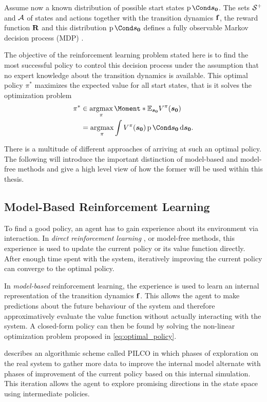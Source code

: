 Assume now a known distribution of possible start states $\Prob{\rv{s_0}}$.
The sets $\mathcal{S}^+$ and $\mathcal{A}$ of states and actions together with the transition dynamics $\operatorname{\mathbf{f}}$, the reward function $\operatorname{\mathbf{R}}$ and this distribution $\Prob{\rv{s_0}}$ defines a fully observable Markov decision process (MDP) \cite{sutton_reinforcement_1998,murphy_machine_2012}.

The objective of the reinforcement learning problem stated here is to find the most successful policy to control this decision process under the assumption that no expert knowledge about the transition dynamics is available.
This optimal policy $\pi^*$ maximizes the expected value for all start states, that is it solves the optimization problem
\begin{align}
    \label{eq:optimal_policy}
    \pi^* &\in \argmax_{\pi} \Moment*{\E_{\rv{s_0}}}{V^\pi(\rv{s_0})} \\
    &= \argmax_{\pi} \int V^\pi(\rv{s_0}) \Prob{\rv{s_0}} \diff \rv{s_0}.
\end{align}

There is a multitude of different approaches of arriving at such an optimal policy.
The following will introduce the important distinction of model-based and model-free methods and give a high level view of how the former will be used within this thesis.

\subsection{Model-Based Reinforcement Learning}
To find a good policy, an agent has to gain experience about its environment via interaction.
In \emph{direct reinforcement learning} \cite{sutton_reinforcement_1998}, or model-free methods, this experience is used to update the current policy or its value function directly.
After enough time spent with the system, iteratively improving the current policy can converge to the optimal policy.

In \emph{model-based} reinforcement learning, the experience is used to learn an internal representation of the transition dynamics $\operatorname{\mathbf{f}}$.
This allows the agent to make predictions about the future behaviour of the system and therefore approximatively evaluate the value function without actually interacting with the system.
A closed-form policy can then be found by solving the non-linear optimization problem proposed in \cref{eq:optimal_policy}.

\citeauthor{deisenroth_efficient_2010} \cite{deisenroth_efficient_2010} describes an algorithmic scheme called PILCO in which phases of exploration on the real system to gather more data to improve the internal model alternate with phases of improvement of the current policy based on this internal simulation.
This iteration allows the agent to explore promising directions in the state space using intermediate policies.

